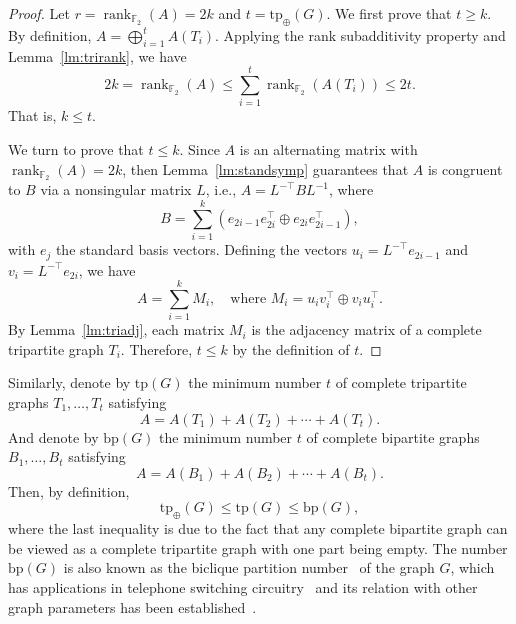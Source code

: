 \begin{proof}
Let $r = \operatorname{rank}_{\mathbb{F}_2}(A) = 2k$ and $t = \mathrm{tp}_{\oplus}(G)$.
We first prove that $t\ge k$.
By definition, $A = \bigoplus_{i=1}^t A(T_i)$. Applying the rank subadditivity property and Lemma~\ref{lm:trirank}, we have
\begin{equation}
2k = \operatorname{rank}_{\mathbb{F}_2}(A) \le \sum_{i=1}^t \operatorname{rank}_{\mathbb{F}_2}(A(T_i)) \le 2t.
\end{equation}
That is, $k \le t$.

We turn to prove that $t\le k$. Since $A$ is an alternating matrix with $\operatorname{rank}_{\mathbb{F}_2}(A)=2k$, then Lemma~\ref{lm:standsymp} guarantees that $A$ is congruent to $B$ via a nonsingular matrix $L$, i.e., $A = L^{-\top} B L^{-1}$, where 
\begin{equation}
    B = \sum_{i=1}^{k} \left( e_{2i-1} e_{2i}^\top \oplus e_{2i} e_{2i-1}^\top \right),
\end{equation}
with $e_j$ the standard basis vectors.
Defining the vectors $u_i = L^{-\top} e_{2i-1}$ and $v_i = L^{-\top} e_{2i}$, we have
\begin{equation}
    A = \sum_{i=1}^{k} M_i, \quad \text{where } M_i = u_i v_i^\top \oplus v_i u_i^\top.
\end{equation}
By Lemma~\ref{lm:triadj}, each matrix $M_i$ is the adjacency matrix of a complete tripartite graph $T_i$. Therefore, $t\le k$ by the definition of $t$.
\end{proof}
Similarly, denote by $\mathrm{tp}(G)$ the minimum number $t$ of complete tripartite graphs $T_1, \ldots, T_t$ satisfying 
\begin{equation}
A = A(T_1) + A(T_2) + \cdots + A(T_t).
\end{equation}
And denote by $\mathrm{bp}(G)$ the minimum number $t$ of complete bipartite graphs $B_1, \ldots, B_t$ satisfying 
\begin{equation}
A = A(B_1) + A(B_2) + \cdots + A(B_t).
\end{equation}
Then, by definition, 
\begin{equation}
\mathrm{tp}_{\oplus}(G) \le \mathrm{tp}(G) \le \mathrm{bp}(G),
\end{equation}
where the last inequality is due to the fact that any complete bipartite graph can be viewed as a complete tripartite graph with one part being empty.
The number $\mathrm{bp}(G)$ is also known as the biclique partition number~\cite{graham1971addressing} of the graph $G$, which has applications in telephone switching circuitry~\cite{graham1971addressing} and its relation with other graph parameters has been established~\cite{lyu2023finding}. 

